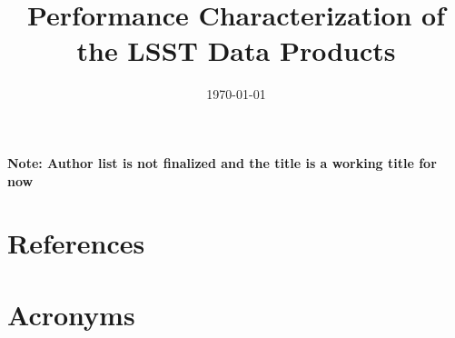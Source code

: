 \documentclass[]{spie}
\date{\today}
\title{Performance Characterization of the LSST Data Products}
\begin{document}
\maketitle

\textbf{Note: Author list is not finalized and the title is a working title for now }






\appendix
%
\section{References} \label{sec:bib}



\section{Acronyms} \label{sec:acronyms}

\end{document}

